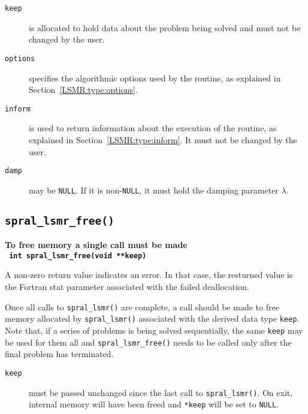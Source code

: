 \begin{description}
\item[\texttt{keep}] is allocated to hold data about the problem being
solved and must not be changed by the user.

\item[\texttt{options}] specifies the algorithmic options used by the routine,
as explained in Section~\ref{LSMR:type:options}.

\item[\texttt{inform}] is used to return information about the execution
of the routine, as explained in Section~\ref{LSMR:type:inform}.
It must not be changed by the user.

\item[\texttt{damp}] may be \texttt{NULL}. If it is non-\texttt{NULL}, it must
hold the damping parameter $\lambda$.

\end{description}



\subsection{\texttt{spral\_lsmr\_free()}}
\textbf{To free memory a single call must be made
   \vspace{0.2cm}\\
    \texttt{ \hspace*{0.2cm}
      int spral\_lsmr\_free(void **keep)
   }
}
\vspace{0.2cm}

\noindent
A non-zero return value indicates an error. In that case, the resturned value
is the Fortran stat parameter associated with the failed deallocation.

\noindent
Once all  calls to \texttt{spral\_lsmr()} are complete,
a call should be made to free memory  allocated by
\texttt{spral\_lsmr()}  associated with the derived data type {\tt keep}.
Note that, if a series of problems is being solved sequentially, the same {\tt keep}
may be used for them all and {\tt spral\_lsmr\_free()} needs to be called only
after the final problem has terminated.

\begin{description}

\item[\texttt{keep}] must be passed unchanged since the last call to \texttt{spral\_lsmr()}.
On exit, internal memory will have been freed and \texttt{*keep}
will be set to \texttt{NULL}.

\end{description}



